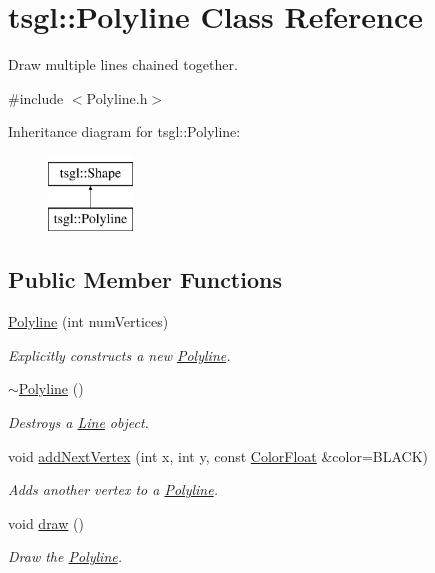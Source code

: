 \hypertarget{classtsgl_1_1_polyline}{}\section{tsgl\+:\+:Polyline Class Reference}
\label{classtsgl_1_1_polyline}


Draw multiple lines chained together.  




{\ttfamily \#include $<$Polyline.\+h$>$}

Inheritance diagram for tsgl\+:\+:Polyline\+:\begin{figure}[H]
\begin{center}
\leavevmode
\includegraphics[height=2.000000cm]{classtsgl_1_1_polyline}
\end{center}
\end{figure}
\subsection*{Public Member Functions}
\begin{DoxyCompactItemize}
\item 
\hyperlink{classtsgl_1_1_polyline_ac618ba8a40d1f8fee9247264dc5e7513}{Polyline} (int num\+Vertices)
\begin{DoxyCompactList}\small\item\em Explicitly constructs a new \hyperlink{classtsgl_1_1_polyline}{Polyline}. \end{DoxyCompactList}\item 
\hyperlink{classtsgl_1_1_polyline_a5e186f8a65dae833d123480552b0eaad}{$\sim$\+Polyline} ()
\begin{DoxyCompactList}\small\item\em Destroys a \hyperlink{classtsgl_1_1_line}{Line} object. \end{DoxyCompactList}\item 
void \hyperlink{classtsgl_1_1_polyline_ab6598c7f60e57d9b988b19e90123da53}{add\+Next\+Vertex} (int x, int y, const \hyperlink{structtsgl_1_1_color_float}{Color\+Float} \&color=B\+L\+A\+C\+K)
\begin{DoxyCompactList}\small\item\em Adds another vertex to a \hyperlink{classtsgl_1_1_polyline}{Polyline}. \end{DoxyCompactList}\item 
void \hyperlink{classtsgl_1_1_polyline_ac6de5e2817824d9427d02d3e7be37f47}{draw} ()
\begin{DoxyCompactList}\small\item\em Draw the \hyperlink{classtsgl_1_1_polyline}{Polyline}. \end{DoxyCompactList}\end{DoxyCompactItemize}
